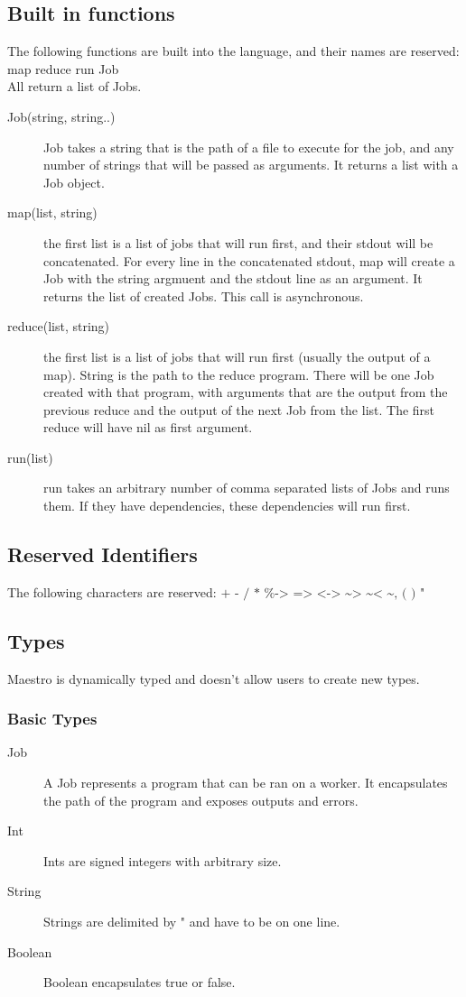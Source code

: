 \documentclass[12pt]{article}
\begin{document}
\subsection{Built in functions}
The following functions are built into the language, and their names are reserved:\\
map reduce run Job\\
All return a list of Jobs.
\begin{description}
  \item[Job(string, string..)] Job takes a string that is the path of a file to
    execute for the job, and any number of strings that will be passed as
    arguments. It returns a list with a Job object.
  \item[map(list, string)] the first list is a list of jobs that will run first, and their
    stdout will be concatenated. For every line in the concatenated stdout, map will create
    a Job with the string argmuent and the stdout line as an argument. It returns the list
    of created Jobs. This call is asynchronous.
  \item[reduce(list, string)] the first list is a list of jobs that will run first (usually the
    output of a map). String is the path to the reduce program. There will be one Job
    created with that program, with arguments that are the output from the previous reduce and
    the output of the next Job from the list. The first reduce will have nil as first argument.
  \item[run(list)] run takes an arbitrary number of comma separated lists of Jobs
    and runs them. If they have dependencies, these dependencies will run first.
\end{description}

\subsection{Reserved Identifiers}
The following characters are reserved: $\texttt{+ - / * \% -> => <-> \textasciitilde>
\textasciitilde< \textasciitilde , ( ) "}$

\subsection{Types}
Maestro is dynamically typed and doesn't allow users to create new types.
\subsubsection{Basic Types}
\begin{description}
  \item[Job] A Job represents a program that can be ran on a worker. It encapsulates
    the path of the program and exposes outputs and errors.
  \item[Int] Ints are signed integers with arbitrary size.
  \item[String] Strings are delimited by " and have to be on one line.
  \item[Boolean] Boolean encapsulates true or false.
\end{description}
\end{document}
